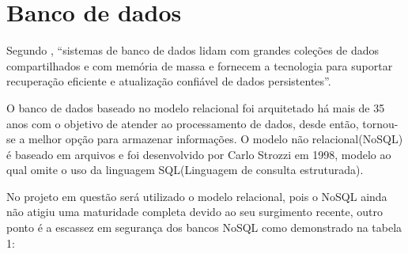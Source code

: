

\section{Banco de dados}
\label{sec:opencv}

Segundo \cite{ceri2013logic}, “sistemas de banco de dados lidam com grandes coleções de dados compartilhados e com memória de massa e fornecem a tecnologia para suportar recuperação eficiente e atualização confiável de dados persistentes”. \par
O banco de dados baseado no modelo relacional foi arquitetado há mais de 35 anos com o objetivo de atender ao processamento de dados, desde então, tornou-se a melhor opção para armazenar informações. O modelo não relacional(NoSQL) é baseado em arquivos e foi desenvolvido por Carlo Strozzi em 1998, modelo ao qual omite o uso da linguagem SQL(Linguagem de consulta estruturada).\cite{mohamed2014relationalvsnosql} \par
No projeto em questão será utilizado o modelo relacional, pois o NoSQL ainda não atigiu uma maturidade completa devido ao seu surgimento recente, outro ponto é a escassez em segurança dos bancos NoSQL como demonstrado na tabela 1\cite{mohamed2014relationalvsnosql}: \par

